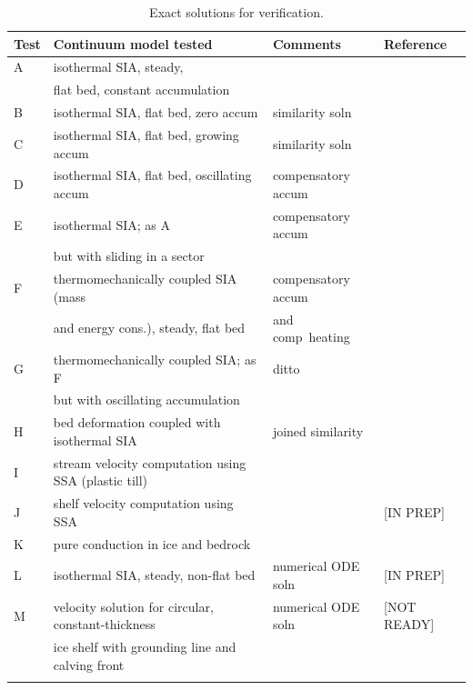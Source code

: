 \documentclass[11pt,final]{amsart}
\begin{document}
\begin{table}[ht]
\caption{Exact solutions for verification.}\label{tab:tests}
\small
\begin{tabular}{@{}llll}\hline
\textbf{Test} & \textbf{Continuum model tested} & \textbf{Comments} & \textbf{Reference} \\ \hline
A & isothermal SIA, steady, &  & \cite{BLKCB} \\
 & flat bed, constant accumulation &  &  \\
B & isothermal SIA, flat bed, zero accum & similarity soln & \cite{BLKCB,Halfar83} \\
C & isothermal SIA, flat bed, growing accum & similarity soln & \cite{BLKCB} \\
D & isothermal SIA, flat bed, oscillating accum & compensatory accum & \cite{BLKCB} \\
E & isothermal SIA; as A &  compensatory accum & \cite{BLKCB} \\
 & but with sliding in a sector &  &  \\
F & thermomechanically coupled SIA (mass &  compensatory accum & \cite{BB,BBL} \\
 & and energy cons.), steady, flat bed & and comp~heating &  \\
G & thermomechanically coupled SIA; as F  & ditto & \cite{BB,BBL} \\
 & but with oscillating accumulation &  &  \\
H & bed deformation coupled with isothermal SIA & joined similarity & \cite{BLKfastearth} \\
I & stream velocity computation using SSA (plastic till) &  & \cite{SchoofStream,BBssasliding} \\
J & shelf velocity computation using SSA  &  & [IN PREP] \\
K & pure conduction in ice and bedrock & & \cite{BuelerTestK} \\
L & isothermal SIA, steady, non-flat bed & numerical ODE soln & [IN PREP] \\
M & velocity solution for circular, constant-thickness  & numerical ODE soln & [NOT READY] \\
 & ice shelf with grounding line and calving front &  &  \\
\hline
\normalsize
\end{tabular}
\end{table}
\end{document}
